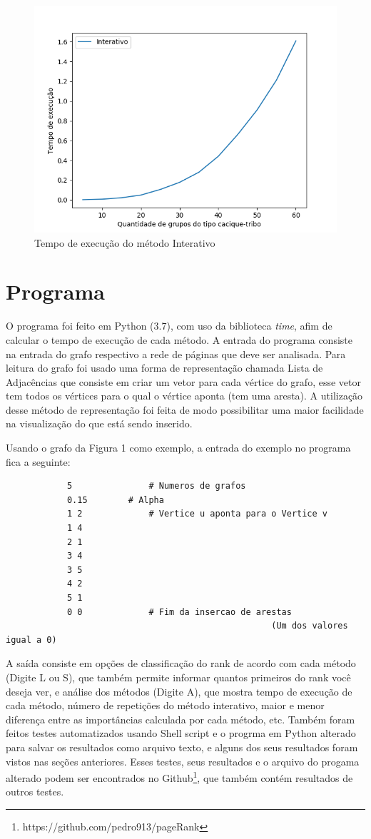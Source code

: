 \documentclass[12pt]{article}
\begin{document}
		\begin{figure}
  			\centering
  			\includegraphics[width=0.7\linewidth]{interativo.png}
  			\caption{Tempo de execução do método Interativo} \label{fig:M1}
		\end{figure}
		
\newpage

\vspace{3em}

\section{Programa}
	O programa foi feito em Python (3.7), com uso da biblioteca \emph{time}, afim de calcular o tempo de execução de cada método. A entrada do programa consiste na entrada do grafo respectivo a rede de páginas que deve ser analisada. Para leitura do grafo foi usado uma forma de representação chamada Lista de Adjacências que consiste em criar um vetor para cada vértice do grafo, esse vetor tem todos os vértices para o qual o vértice aponta (tem uma aresta). A utilização desse método de representação foi feita de modo possibilitar uma maior facilidade na visualização do que está sendo inserido.
		
	Usando o grafo da Figura 1 como exemplo, a entrada do exemplo no programa fica a seguinte:
	
		\begin{lstlisting}
			5 			 	# Numeros de grafos
			0.15 		# Alpha
			1 2				# Vertice u aponta para o Vertice v
			1 4
			2 1
			3 4
			3 5
			4 2
			5 1
			0 0				# Fim da insercao de arestas
													(Um dos valores igual a 0)
		\end{lstlisting}
	
	A saída consiste em opções de classificação do rank de acordo com cada método (Digite L ou S), que também permite informar quantos primeiros do rank você deseja ver, e análise dos métodos (Digite A), que mostra tempo de execução de cada método, número de repetições do método interativo, maior e menor diferença entre as importâncias calculada por cada método, etc. Também foram feitos testes automatizados usando Shell script e o progrma em Python alterado para salvar os resultados como arquivo texto, e alguns dos seus resultados foram vistos nas seções anteriores. Esses testes, seus resultados e o arquivo do progama alterado podem ser encontrados no Github\footnote{https://github.com/pedro913/pageRank}, que também contém resultados de outros testes.
	
\end{document}
